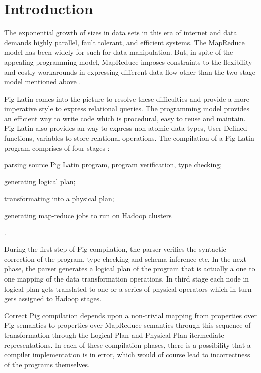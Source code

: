 \section{Introduction}
\label{sec:intro}

{\bf}

The exponential growth of sizes in data sets in this era of internet and data demands highly parallel, fault tolerant, and efficient systems. The MapReduce model \cite{dean2004mapreduce,dean2010mapreduce} has been widely for such for data manipulation. But, in spite of the appealing programming model, MapReduce imposes constraints to the flexibility and costly workarounds in expressing different data flow other than the two stage model mentioned above \cite{olston2008pig}.

Pig Latin comes into the picture to resolve these difficulties and provide a more imperative style to express relational queries. The programming model provides an efficient way to write code which is procedural, easy to reuse and maintain. Pig Latin also provides an way to express non-atomic data types, User Defined functions, variables to store relational operations.
The compilation of a Pig Latin program comprises of four stages \cite{gates2009building}: \begin{enumerate*}[label=\itshape\alph*\upshape)] \item parsing source Pig Latin program, program verification, type checking; \item generating logical plan; \item transformating into a physical plan; \item generating map-reduce jobs to run on Hadoop clusters \end{enumerate*}.

During the first step of Pig compilation, the parser verifies the syntactic correction of the program, type checking and schema inference etc. In the next phase, the parser generates a logical plan of the program that is actually a one to one mapping of the data transformation operations. In third stage each node in logical plan gets translated to one or a series of physical operators which in turn gets assigned to Hadoop stages.

Correct Pig compilation depends upon a non-trivial mapping from properties over Pig semantics to properties over MapReduce semantics through this sequence of transformation through the Logical Plan and Physical Plan itermediate representations. In each of these compilation phases, there is a possibility that a compiler implementation is in error, which would of course lead to incorrectness of the programs themselves.

